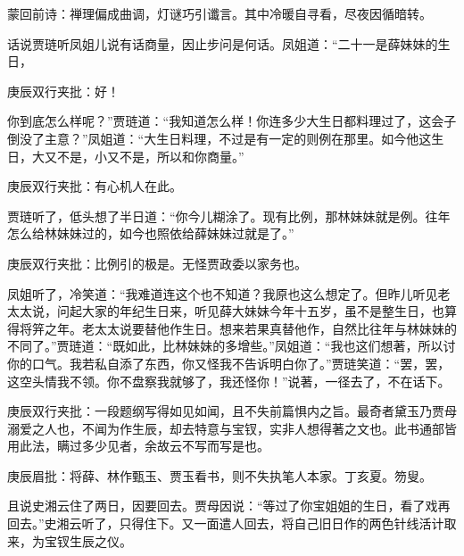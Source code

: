 
\begin{parag}
    \begin{note}蒙回前诗：禅理偏成曲调，灯谜巧引谶言。其中冷暖自寻看，尽夜因循暗转。\end{note}
\end{parag}


\begin{parag}
    话说贾琏听凤姐儿说有话商量，因止步问是何话。凤姐道：“二十一是薛妹妹的生日，\begin{note}庚辰双行夹批：好！\end{note}你到底怎么样呢？”贾琏道：“我知道怎么样！你连多少大生日都料理过了，这会子倒没了主意？”凤姐道：“大生日料理，不过是有一定的则例在那里。如今他这生日，大又不是，小又不是，所以和你商量。”\begin{note}庚辰双行夹批：有心机人在此。\end{note}贾琏听了，低头想了半日道：“你今儿糊涂了。现有比例，那林妹妹就是例。往年怎么给林妹妹过的，如今也照依给薛妹妹过就是了。”\begin{note}庚辰双行夹批：比例引的极是。无怪贾政委以家务也。\end{note}凤姐听了，冷笑道：“我难道连这个也不知道？我原也这么想定了。但昨儿听见老太太说，问起大家的年纪生日来，听见薛大妹妹今年十五岁，虽不是整生日，也算得将笄之年。老太太说要替他作生日。想来若果真替他作，自然比往年与林妹妹的不同了。”贾琏道：“既如此，比林妹妹的多增些。”凤姐道：“我也这们想著，所以讨你的口气。我若私自添了东西，你又怪我不告诉明白你了。”贾琏笑道：“罢，罢，这空头情我不领。你不盘察我就够了，我还怪你！”说著，一径去了，不在话下。\begin{note}庚辰双行夹批：一段题纲写得如见如闻，且不失前篇惧内之旨。最奇者黛玉乃贾母溺爱之人也，不闻为作生辰，却去特意与宝钗，实非人想得著之文也。此书通部皆用此法，瞒过多少见者，余故云不写而写是也。\end{note}\begin{note}庚辰眉批：将薛、林作甄玉、贾玉看书，则不失执笔人本家。丁亥夏。笏叟。\end{note}
\end{parag}


\begin{parag}
    且说史湘云住了两日，因要回去。贾母因说：“等过了你宝姐姐的生日，看了戏再回去。”史湘云听了，只得住下。又一面遣人回去，将自己旧日作的两色针线活计取来，为宝钗生辰之仪。
\end{parag}


